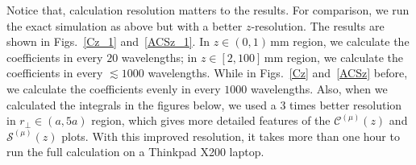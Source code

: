 \newpage
Notice that, calculation resolution matters to the results. For comparison, we run the exact simulation as above but with a better $ z $-resolution.  The results are shown in Figs.~\ref{Cz_1} and~\ref{ACSz_1}. In $ z\in (0,1)\,\mathrm{mm} $ region, we calculate the coefficients in every $ 20 $ wavelengths; in $ z\in[2,100]\,\mathrm{mm} $ region, we calculate the coefficients in every $ \lesssim 1000 $ wavelengths. While in Figs.~\ref{Cz} and~\ref{ACSz} before, we calculate the coefficients evenly in every $ 1000 $ wavelengths. Also, when we calculated the integrals in the figures below, we used a $ 3 $ times better resolution in $ r_\perp\in(a,5a) $ region, which gives more detailed features of the $ \mathcal{C}^{(\mu)} (z)$ and $ \mathcal{S}^{(\mu)}(z) $ plots. With this improved resolution, it takes more than one hour to run the full calculation on a Thinkpad X200 laptop. 

